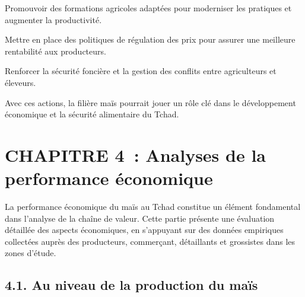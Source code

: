 \documentclass[12pt,oneside]{report}
\begin{document}
Promouvoir des formations agricoles adaptées pour moderniser les pratiques et augmenter la productivité.

Mettre en place des politiques de régulation des prix pour assurer une meilleure rentabilité aux producteurs.

Renforcer la sécurité foncière et la gestion des conflits entre agriculteurs et éleveurs.

Avec ces actions, la filière maïs pourrait jouer un rôle clé dans le développement économique et la sécurité alimentaire du Tchad.

\chapter{CHAPITRE 4 : Analyses de la performance économique}
La performance économique du maïs au Tchad constitue un élément fondamental dans l'analyse de la chaîne de valeur. Cette partie présente une évaluation détaillée des aspects économiques, en s'appuyant sur des données empiriques collectées auprès des producteurs, commerçant, détaillants et grossistes dans les zones d'étude.

\section{4.1. Au niveau de la production du maïs}
\end{document}
